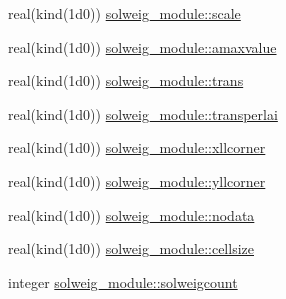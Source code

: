 \begin{DoxyCompactItemize}
\item 
real(kind(1d0)) \hyperlink{namespacesolweig__module_a5ab819878e67cce03ccd8ee36f20acf3}{solweig\+\_\+module\+::scale}
\item 
real(kind(1d0)) \hyperlink{namespacesolweig__module_a0455899b7ac1e0dcf212eab8b302276e}{solweig\+\_\+module\+::amaxvalue}
\item 
real(kind(1d0)) \hyperlink{namespacesolweig__module_af7c3a5fbe4297a3e22af0e2b350c0311}{solweig\+\_\+module\+::trans}
\item 
real(kind(1d0)) \hyperlink{namespacesolweig__module_abd04dc024e2ed4adfe36e165d6e5a92e}{solweig\+\_\+module\+::transperlai}
\item 
real(kind(1d0)) \hyperlink{namespacesolweig__module_aa077076360ddac9784d30693f88a4fc8}{solweig\+\_\+module\+::xllcorner}
\item 
real(kind(1d0)) \hyperlink{namespacesolweig__module_ac214a03385acfaa638e2a31c58f182ee}{solweig\+\_\+module\+::yllcorner}
\item 
real(kind(1d0)) \hyperlink{namespacesolweig__module_a0792a6e09bd22061b90eb624cd50e765}{solweig\+\_\+module\+::nodata}
\item 
real(kind(1d0)) \hyperlink{namespacesolweig__module_a8e19893b8a4fa33e4a195d94a8aba8e2}{solweig\+\_\+module\+::cellsize}
\item 
integer \hyperlink{namespacesolweig__module_a466d8cf9dd423b05c00deaf1ac231f2c}{solweig\+\_\+module\+::solweigcount}
\end{DoxyCompactItemize}
